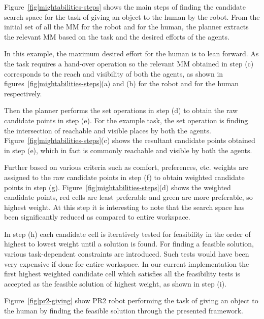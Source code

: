\documentclass{svmult}
\begin{document}
Figure~\ref{fig|mightabilities-steps} shows the main steps of finding the
candidate search space for the task of giving an object to the human by the
robot. From the initial set of all the MM for the robot and for the human, the
planner extracts the relevant MM based on the task and the desired efforts of
the agents.

In this example, the maximum desired effort for the human is to lean forward.
As the task requires a hand-over operation so the relevant MM obtained in step
(c) corresponds to the reach and visibility of both the agents, as shown in
figures~\ref{fig|mightabilities-steps}(a) and (b) for the robot and for the
human respectively.

Then the planner performs the set operations in step (d) to obtain the raw
candidate points in step (e). For the example task, the set operation is
finding the intersection of reachable and visible places by both the agents.
Figure~\ref{fig|mightabilities-steps}(c) shows the resultant candidate points
obtained in step (e), which in fact is commonly reachable and visible by both
the agents. 

Further based on various criteria such as comfort, preferences, etc. weights
are assigned to the raw candidate points in step (f) to obtain weighted
candidate points in step (g). Figure~\ref{fig|mightabilities-steps}(d) shows
the weighted candidate points, red cells are least preferable and green are
more preferable, so highest weight. At this step it is interesting to note that
the search space has been significantly reduced as compared to entire
workspace.  

In step (h) each candidate cell is iteratively tested for feasibility in the
order of highest to lowest weight until a solution is found. For finding a
feasible solution, various task-dependent constraints are introduced. Such
tests would have been very expensive if done for entire workspace.  In our
current implementation the first highest weighted candidate cell which
satisfies all the feasibility tests is accepted as the feasible solution of
highest weight, as shown in step (i). 

Figure~\ref{fig|pr2-giving} show PR2 robot performing the task of giving an
object to the human by finding the feasible solution through the presented
framework. 
\end{document}
